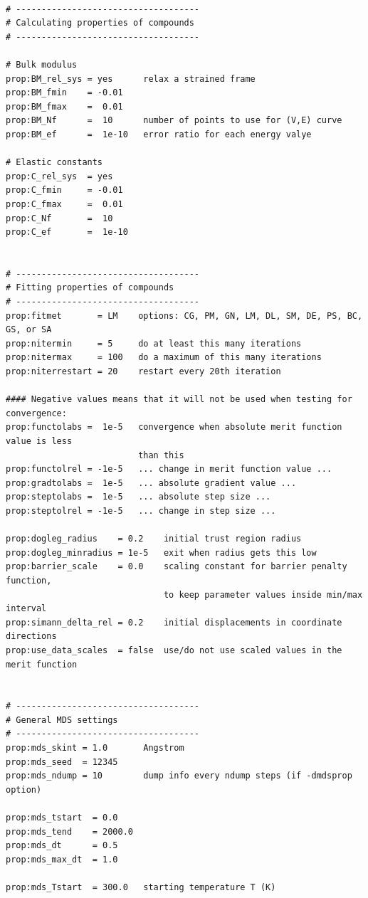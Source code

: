 \documentclass[a4paper,12pt,pdftex,onecolumn]{article}
\begin{document}
\begin{Verbatim}[fontsize=\relsize{-1},frame=single]

# ------------------------------------
# Calculating properties of compounds
# ------------------------------------

# Bulk modulus
prop:BM_rel_sys = yes      relax a strained frame
prop:BM_fmin    = -0.01
prop:BM_fmax    =  0.01
prop:BM_Nf      =  10      number of points to use for (V,E) curve
prop:BM_ef      =  1e-10   error ratio for each energy valye

# Elastic constants
prop:C_rel_sys  = yes
prop:C_fmin     = -0.01
prop:C_fmax     =  0.01
prop:C_Nf       =  10
prop:C_ef       =  1e-10


# ------------------------------------
# Fitting properties of compounds
# ------------------------------------
prop:fitmet       = LM    options: CG, PM, GN, LM, DL, SM, DE, PS, BC, GS, or SA
prop:nitermin     = 5     do at least this many iterations
prop:nitermax     = 100   do a maximum of this many iterations
prop:niterrestart = 20    restart every 20th iteration

#### Negative values means that it will not be used when testing for convergence:
prop:functolabs =  1e-5   convergence when absolute merit function value is less
                          than this
prop:functolrel = -1e-5   ... change in merit function value ...
prop:gradtolabs =  1e-5   ... absolute gradient value ...
prop:steptolabs =  1e-5   ... absolute step size ...
prop:steptolrel = -1e-5   ... change in step size ...

prop:dogleg_radius    = 0.2    initial trust region radius
prop:dogleg_minradius = 1e-5   exit when radius gets this low
prop:barrier_scale    = 0.0    scaling constant for barrier penalty function,
                               to keep parameter values inside min/max interval
prop:simann_delta_rel = 0.2    initial displacements in coordinate directions
prop:use_data_scales  = false  use/do not use scaled values in the merit function


# ------------------------------------
# General MDS settings
# ------------------------------------
prop:mds_skint = 1.0       Angstrom
prop:mds_seed  = 12345
prop:mds_ndump = 10        dump info every ndump steps (if -dmdsprop option)

prop:mds_tstart  = 0.0
prop:mds_tend    = 2000.0
prop:mds_dt      = 0.5
prop:mds_max_dt  = 1.0

prop:mds_Tstart  = 300.0   starting temperature T (K)


\end{Verbatim}
\end{document}
